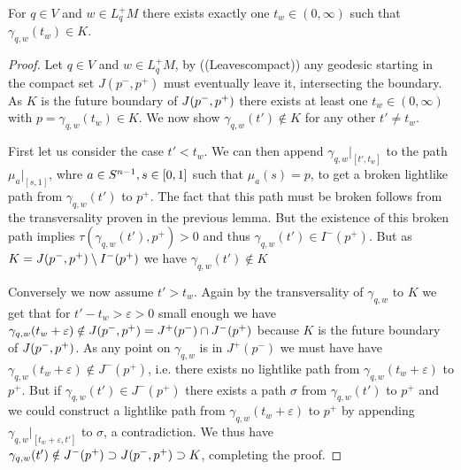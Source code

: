 \begin{lemma}\label{lem:hitsonce}
    For $q\in V$ and $w\in L^+_qM$ there exists exactly one $t_w\in (0,\infty)$ such that $\gamma_{q,w}(t_w)\in K$.
\end{lemma}
\begin{proof}
    Let $q\in V$ and $w\in L^+_qM$, by ((Leavescompact)) any geodesic starting in the compact set $J(p^-,p^+)$ must eventually leave it, intersecting the boundary. As $K$ is the future boundary of $J(p^-,p^+)$ there exists at least one $t_w\in (0,\infty)$ with $p=\gamma_{q,w}(t_w)\in K$. We now show $\gamma_{q,w}(t')\notin K$ for any other $t'\neq t_w$.

    First let us consider the case $t'<t_w$. We can then append $\gamma_{q,w}\rvert_{[t',t_w]}$ to the path $\mu_a\rvert_{[s,1]}$, whre $a\in S^{n-1}, s\in [0,1]$ such that $\mu_a(s)=p$, to get a broken lightlike path from $\gamma_{q,w}(t')$ to $p^+$. The fact that this path must be broken follows from the transversality proven in the previous lemma. But the existence of this broken path implies $\tau(\gamma_{q,w}(t'),p^+)>0$ and thus $\gamma_{q,w}(t')\in I^-(p^+)$. But as $K=J(p^-,p^+)\setminus I^-(p^+)$ we have $\gamma_{q,w}(t')\notin K$

    Conversely we now assume $t'>t_w$. Again by the transversality of $\gamma_{q,w}$ to $K$ we get that for $t'-t_w>\varepsilon>0$ small enough we have $\gamma_{q,w}(t_w+\varepsilon)\notin J(p^-,p^+)=J^+(p^-)\cap J^-(p^+)$ because $K$ is the future boundary of $J(p^-,p^+)$. As any point on $\gamma_{q,w}$ is in $J^+(p^-)$ we must have have $\gamma_{q,w}(t_w+\varepsilon) \notin J^-(p^+)$, i.e. there exists no lightlike path from $\gamma_{q,w}(t_w+\varepsilon)$ to $p^+$. But if $\gamma_{q,w}(t')\in J^-(p^+)$ there exists a path $\sigma$ from $\gamma_{q,w}(t')$ to $p^+$ and we could construct a lightlike path from $\gamma_{q,w}(t_w+\varepsilon)$ to $p^+$ by appending $\gamma_{q,w}\rvert_{[t_w+\varepsilon,t']}$ to  $\sigma$, a contradiction. We thus have $\gamma_{q,w}(t')\notin J^-(p^+)\supset J(p^-,p^+)\supset K$, completing the proof.
\end{proof}


